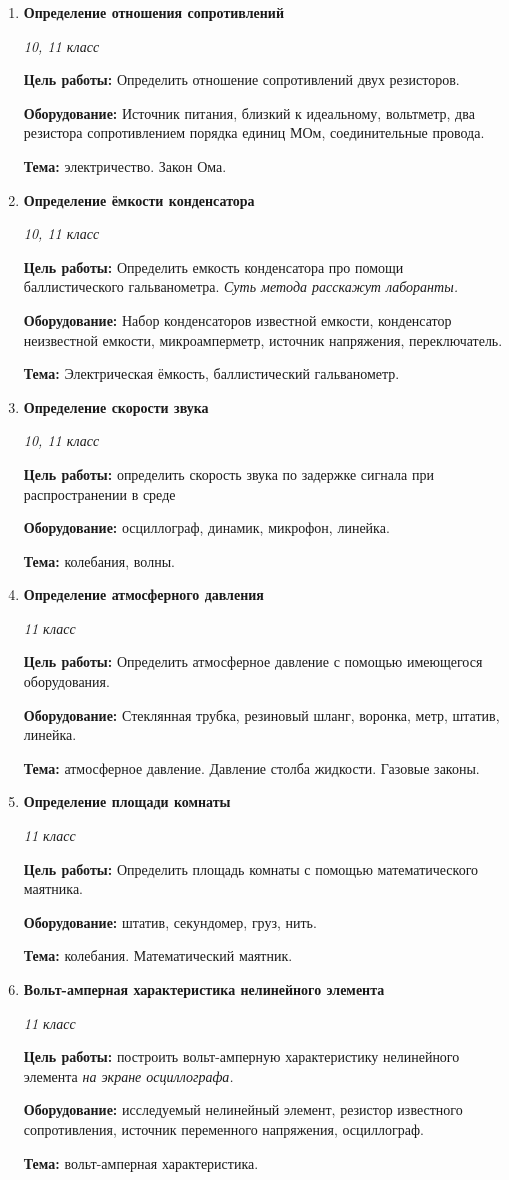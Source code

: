 \documentclass[a4paper,10pt]{article}
\newcommand{\labtitle}[5]{
	\textbf{#2}\par
	\textit{#1 класс}\par
	\textbf{Цель работы:} #3\par
	\textbf{Оборудование:} #4\par
	\textbf{Тема:} #5
}
\begin{document}
\begin{enumerate}
	\item \labtitle
		{10, 11}
		{Определение отношения сопротивлений}
		{Определить отношение сопротивлений двух резисторов.}
		{Источник питания, близкий к идеальному, вольтметр, два резистора сопротивлением порядка единиц МОм, соединительные провода.}
		{электричество. Закон Ома.}
	\item \labtitle
		{10, 11}
		{Определение ёмкости конденсатора}
		{Определить емкость конденсатора про помощи баллистического гальванометра. \textit{Суть метода расскажут лаборанты.}}
		{Набор конденсаторов известной емкости, конденсатор неизвестной емкости, микроамперметр, источник напряжения, переключатель.}
		{Электрическая ёмкость, баллистический гальванометр.}
	\item \labtitle
		{10, 11}
		{Определение скорости звука}
		{определить скорость звука по задержке сигнала при распространении в среде}
		{осциллограф, динамик, микрофон, линейка.}
		{колебания, волны.}
	\item \labtitle
		{11}
		{Определение атмосферного давления}
		{Определить атмосферное давление с помощью имеющегося оборудования.}
		{Стеклянная трубка, резиновый шланг, воронка, метр, штатив, линейка.}
		{атмосферное давление. Давление столба жидкости. Газовые законы.}
	\item \labtitle
		{11}
		{Определение площади комнаты}
		{Определить площадь комнаты с помощью математического маятника.}
		{штатив, секундомер, груз, нить.}
		{колебания. Математический маятник.}
	\item \labtitle
		{11}
		{Вольт-амперная характеристика нелинейного элемента}
		{построить вольт-амперную характеристику нелинейного элемента \textit{на экране осциллографа.}}
		{исследуемый нелинейный элемент, резистор известного сопротивления, источник переменного напряжения, осциллограф.}
		{вольт-амперная характеристика. }

\end{enumerate}
\end{document}
